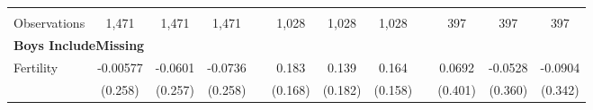 \begin{landscape}
\begin{table}[htpb!]
\begin{center}
\begin{tabular}{lcccp{2mm}cccp{2mm}ccc}
\begin{footnotesize}\end{footnotesize}&\begin{footnotesize}\end{footnotesize}&\begin{footnotesize}\end{footnotesize}&\begin{footnotesize}\end{footnotesize}&\begin{footnotesize}\end{footnotesize}&\begin{footnotesize}\end{footnotesize}&\begin{footnotesize}\end{footnotesize}&\begin{footnotesize}\end{footnotesize}&\begin{footnotesize}\end{footnotesize}&\begin{footnotesize}\end{footnotesize}&\begin{footnotesize}\end{footnotesize}&\begin{footnotesize}\end{footnotesize}\\Observations&1,471&1,471&1,471&&1,028&1,028&1,028&&397&397&397\\
\multicolumn{12}{l}{\textbf{Boys IncludeMissing}}\\ 
Fertility&-0.00577&-0.0601&-0.0736&&0.183&0.139&0.164&&0.0692&-0.0528&-0.0904\\
&(0.258)&(0.257)&(0.258)&&(0.168)&(0.182)&(0.158)&&(0.401)&(0.360)&(0.342)\\

\end{tabular}
\end{center}
\end{table}
\end{landscape}

